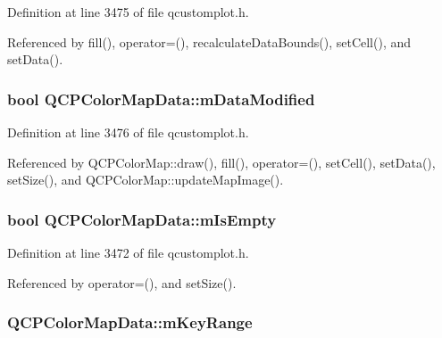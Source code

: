 Definition at line 3475 of file qcustomplot.\+h.



Referenced by fill(), operator=(), recalculate\+Data\+Bounds(), set\+Cell(), and set\+Data().

\hypertarget{class_q_c_p_color_map_data_ad3cc682da2ac14e5acdbc05cf4d3d93b}{}
\subsubsection[{m\+Data\+Modified}]{\setlength{\rightskip}{0pt plus 5cm}bool Q\+C\+P\+Color\+Map\+Data\+::m\+Data\+Modified\hspace{0.3cm}{\ttfamily [protected]}}\label{class_q_c_p_color_map_data_ad3cc682da2ac14e5acdbc05cf4d3d93b}


Definition at line 3476 of file qcustomplot.\+h.



Referenced by Q\+C\+P\+Color\+Map\+::draw(), fill(), operator=(), set\+Cell(), set\+Data(), set\+Size(), and Q\+C\+P\+Color\+Map\+::update\+Map\+Image().

\hypertarget{class_q_c_p_color_map_data_a10e91aa89ed05bd177b1f81e07b465b8}{}
\subsubsection[{m\+Is\+Empty}]{\setlength{\rightskip}{0pt plus 5cm}bool Q\+C\+P\+Color\+Map\+Data\+::m\+Is\+Empty\hspace{0.3cm}{\ttfamily [protected]}}\label{class_q_c_p_color_map_data_a10e91aa89ed05bd177b1f81e07b465b8}


Definition at line 3472 of file qcustomplot.\+h.



Referenced by operator=(), and set\+Size().

\hypertarget{class_q_c_p_color_map_data_aaaafd0d7d0f153dbd152f3daf34254ee}{}
\subsubsection[{m\+Key\+Range}]{ Q\+C\+P\+Color\+Map\+Data\+::m\+Key\+Range\hspace{0.3cm}{\ttfamily [protected]}}\label{class_q_c_p_color_map_data_aaaafd0d7d0f153dbd152f3daf34254ee}



